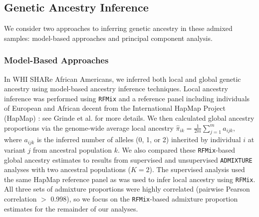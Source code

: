 \documentclass[12pt]{article}
\begin{document}
\subsection{Genetic Ancestry Inference}

We consider two approaches to inferring genetic ancestry in these admixed samples: model-based approaches and principal component analysis.

\subsubsection{Model-Based Approaches}

In WHI SHARe African Americans, we inferred both local and global genetic ancestry using model-based ancestry inference techniques. 
Local ancestry inference was performed using \texttt{RFMix} \citep{rfmix} and a reference panel including individuals of European and African decent from the International HapMap Project (HapMap) \citep{hapmap}: see Grinde et al. \cite{steam} for more details.
We then calculated global ancestry proportions via the genome-wide average local ancestry $\hat\pi_{ik} = \frac{1}{2m}\sum_{j=1}^m a_{ijk},$ where $a_{ijk}$ is the inferred number of alleles (0, 1, or 2) inherited by individual $i$ at variant $j$ from ancestral population $k$.
We also compared these \texttt{RFMix}-based global ancestry estimates to results from supervised and unsupervised \texttt{ADMIXTURE}  \citep{admixture} analyses with two ancestral populations ($K = 2$).
The supervised analysis used the same HapMap reference panel as was used to infer local ancestry using \texttt{RFMix}.
All three sets of admixture proportions were highly correlated (pairwise Pearson correlation $>$ 0.998), so we focus on the \texttt{RFMix}-based admixture proportion estimates for the remainder of our analyses.
\end{document}
